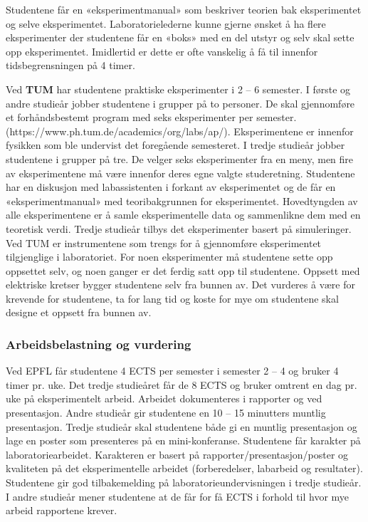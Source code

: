 \documentclass{article}
\begin{document}
Studentene får en «eksperimentmanual» som beskriver teorien bak eksperimentet og selve eksperimentet. Laboratorielederne kunne gjerne ønsket å ha flere eksperimenter der studentene får en «boks» med en del utstyr og selv skal sette opp eksperimentet. Imidlertid er dette er ofte vanskelig å få til innenfor tidsbegrensningen på 4 timer.

Ved \textbf{TUM} har studentene praktiske eksperimenter i 2 – 6 semester. I første og andre studieår jobber studentene i grupper på to personer. De skal gjennomføre et forhåndsbestemt program med seks eksperimenter per semester. (https://www.ph.tum.de/academics/org/labs/ap/). Eksperimentene er innenfor fysikken som ble undervist det foregående semesteret. 
I tredje studieår jobber studentene i grupper på tre. De velger seks eksperimenter fra en meny, men fire av eksperimentene må være innenfor deres egne valgte studeretning. Studentene har en diskusjon med labassistenten i forkant av eksperimentet og de får en «eksperimentmanual» med teoribakgrunnen for eksperimentet. Hovedtyngden av alle eksperimentene er å samle eksperimentelle data og sammenlikne dem med en teoretisk verdi. Tredje studieår tilbys det eksperimenter basert på simuleringer. 
Ved TUM er instrumentene som trengs for å gjennomføre eksperimentet tilgjenglige i laboratoriet. For noen eksperimenter må studentene sette opp oppsettet selv, og noen ganger er det ferdig satt opp til studentene. Oppsett med elektriske kretser bygger studentene selv fra bunnen av. Det vurderes å være for krevende for studentene, ta for lang tid og koste for mye om studentene skal designe et oppsett fra bunnen av. 

\subsubsection{Arbeidsbelastning og vurdering}
Ved EPFL får studentene 4 ECTS per semester i semester 2 – 4 og bruker 4 timer pr. uke. Det tredje studieåret får de 8 ECTS og bruker omtrent en dag pr. uke på eksperimentelt arbeid. Arbeidet dokumenteres i rapporter og ved presentasjon. Andre studieår gir studentene en 10 – 15 minutters muntlig presentasjon. Tredje studieår skal studentene både gi en muntlig presentasjon og lage en poster som presenteres på en mini-konferanse. Studentene får karakter på laboratoriearbeidet. Karakteren er basert på rapporter/presentasjon/poster og kvaliteten på det eksperimentelle arbeidet (forberedelser, labarbeid og resultater). 
Studentene gir god tilbakemelding på laboratorieundervisningen i tredje studieår. I andre studieår mener studentene at de får for få ECTS i forhold til hvor mye arbeid rapportene krever. 
\end{document}
